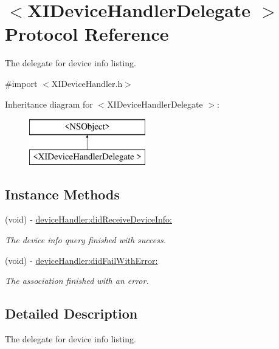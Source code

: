 \hypertarget{protocol_x_i_device_handler_delegate_01-p}{}\section{$<$X\+I\+Device\+Handler\+Delegate $>$ Protocol Reference}
\label{protocol_x_i_device_handler_delegate_01-p}


The delegate for device info listing.  




{\ttfamily \#import $<$X\+I\+Device\+Handler.\+h$>$}

Inheritance diagram for $<$X\+I\+Device\+Handler\+Delegate $>$\+:\begin{figure}[H]
\begin{center}
\leavevmode
\includegraphics[height=2.000000cm]{protocol_x_i_device_handler_delegate_01-p}
\end{center}
\end{figure}
\subsection*{Instance Methods}
\begin{DoxyCompactItemize}
\item 
(void) -\/ \hyperlink{protocol_x_i_device_handler_delegate_01-p_adb58e010ff32be7cf5edec6ee80b4d9b}{device\+Handler\+:did\+Receive\+Device\+Info\+:}
\begin{DoxyCompactList}\small\item\em The device info query finished with success. \end{DoxyCompactList}\item 
(void) -\/ \hyperlink{protocol_x_i_device_handler_delegate_01-p_a6de7852e3e6bef6f5183820f3472fd4b}{device\+Handler\+:did\+Fail\+With\+Error\+:}
\begin{DoxyCompactList}\small\item\em The association finished with an error. \end{DoxyCompactList}\end{DoxyCompactItemize}


\subsection{Detailed Description}
The delegate for device info listing. 

